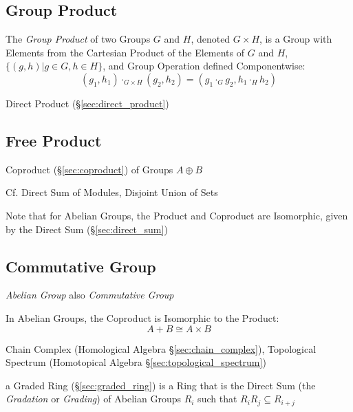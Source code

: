 \subsection{Group Product}\label{sec:group_product}

The \emph{Group Product} of two Groups $G$ and $H$, denoted $G \times
H$, is a Group with Elements from the Cartesian Product of the
Elements of $G$ and $H$, $\{(g,h) | g \in G, h \in H\}$, and Group
Operation defined Componentwise:
\[
    (g_1, h_1) \cdot_{G \times H} (g_2, h_2)
    = (g_1 \cdot_G g_2, h_1 \cdot_H h_2)
\]

Direct Product (\S\ref{sec:direct_product})



\subsection{Free Product}\label{sec:free_product}

Coproduct (\S\ref{sec:coproduct}) of Groups $A \oplus B$

\fist Cf. Direct Sum of Modules, Disjoint Union of Sets

\fist Note that for Abelian Groups, the Product and Coproduct
are Isomorphic, given by the Direct Sum (\S\ref{sec:direct_sum})



\subsection{Commutative Group}\label{sec:commutative_group}

\emph{Abelian Group} also \emph{Commutative Group}

In Abelian Groups, the Coproduct is Isomorphic to the Product:
\[
  A + B \cong A \times B
\]

\fist Chain Complex (Homological Algebra \S\ref{sec:chain_complex}), Topological
Spectrum (Homotopical Algebra \S\ref{sec:topological_spectrum})

\fist a Graded Ring (\S\ref{sec:graded_ring}) is a Ring that is the Direct Sum
(the \emph{Gradation} or \emph{Grading}) of Abelian Groups $R_i$ such that
$R_iR_j \subseteq R_{i+j}$

